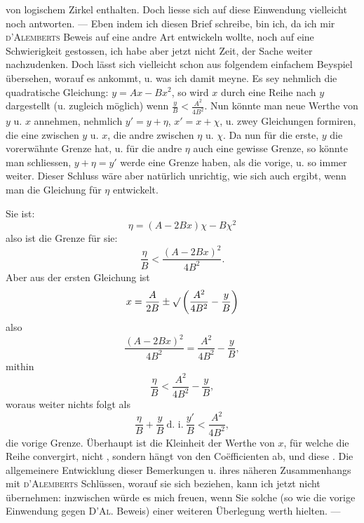 von logischem Zirkel enthalten. Doch liesse sich auf diese Einwendung vielleicht noch antworten.
— Eben indem ich diesen Brief schreibe, bin ich, da ich mir \textsc{d’Alemberts} Beweis auf eine
andre Art entwickeln wollte, noch auf eine Schwierigkeit gestossen, ich habe aber jetzt nicht Zeit,
der Sache weiter nachzudenken. Doch lässt sich vielleicht schon aus folgendem einfachem Beyspiel
übersehen, worauf es ankommt, u. was ich damit meyne. Es sey nehmlich die quadratische Gleichung:
$y=Ax-Bx^2$, so wird $x$ durch eine  Reihe nach $y$ dargestellt
(u. zugleich möglich) wenn $\frac yB<\frac{A^2}{4B^2}$. Nun könnte man neue Werthe von $y$ u. $x$
annehmen, nehmlich $y'=y+\eta$, $x'=x+\chi$, u. zwey Gleichungen formiren, die eine zwischen $y$
u. $x$, die andre zwischen $\eta$ u. $\chi$. Da nun für die erste, $y$ die vorerwähnte Grenze
hat, u. für die andre $\eta$ auch eine gewisse Grenze, so könnte man schliessen, $y+\eta=y'$
werde eine  Grenze haben, als die vorige, u. so immer weiter.
Dieser Schluss wäre aber natürlich unrichtig, wie sich auch ergibt, wenn man die Gleichung
für $\eta$ entwickelt.

Sie ist:
\[
\eta=(A-2Bx)\chi-B\chi^2
\]
\noindent also ist die Grenze für sie:
\[
\frac\eta B<\frac{(A-2Bx)^2}{4B^2}.
\]
\clearpage
{}
\noindent Aber aus der ersten Gleichung ist
\[
x=\frac A{2B}\pm\surd\left(\frac{A^2}{4B^2}-\frac yB\right)
\]
\noindent also
\[
\frac{(A-2Bx)^2}{4B^2}=\frac{A^2}{4B^2}-\frac yB,
\]
\noindent mithin
\[
\frac\eta B<\frac{A^2}{4B^2}-\frac yB,
\]
\noindent woraus weiter nichts folgt als
\[
\frac\eta B+\frac yB\ \text{d. i.}\ \frac{y'}B<\frac{A^2}{4B^2},
\]
\noindent die vorige Grenze. Überhaupt ist die Kleinheit der Werthe von $x$, für welche
die Reihe convergirt, nicht , sondern hängt von den Coëfficienten ab,
und diese . Die allgemeinere Entwicklung dieser
Bemerkungen u. ihres näheren Zusammenhangs mit \textsc{d’Alemberts} Schlüssen, worauf sie sich
beziehen, kann ich jetzt nicht übernehmen: inzwischen würde es mich freuen, wenn Sie solche
(so wie die vorige Einwendung gegen \textsc{D’Al.} Beweis) einer weiteren Überlegung werth hielten. —

